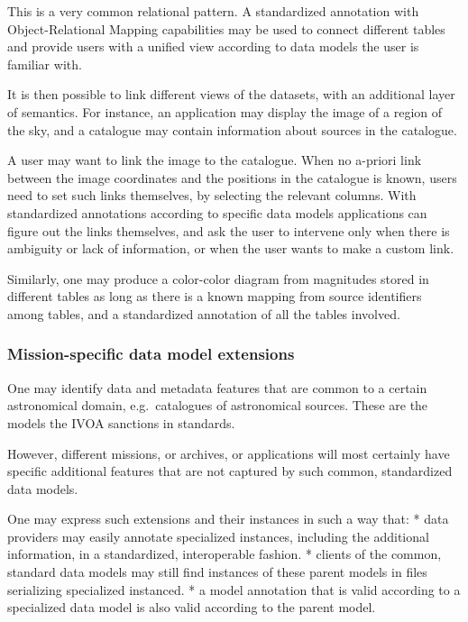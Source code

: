 \documentclass[11pt,a4paper]{ivoa}
\begin{document}
This is a very common relational pattern. A standardized annotation with
Object-Relational Mapping capabilities may be used to connect different
tables and provide users with a unified view according to data models
the user is familiar with.

It is then possible to link different views of the datasets, with an
additional layer of semantics. For instance, an application may display
the image of a region of the sky, and a catalogue may contain
information about sources in the catalogue.

A user may want to link the image to the catalogue. When no a-priori
link between the image coordinates and the positions in the catalogue is
known, users need to set such links themselves, by selecting the
relevant columns. With standardized annotations according to specific
data models applications can figure out the links themselves, and ask
the user to intervene only when there is ambiguity or lack of
information, or when the user wants to make a custom link.

Similarly, one may produce a color-color diagram from magnitudes stored
in different tables as long as there is a known mapping from source
identifiers among tables, and a standardized annotation of all the
tables involved.

\subsubsection{Mission-specific data model
extensions}\label{mission-specific-data-model-extensions}

One may identify data and metadata features that are common to a certain
astronomical domain, e.g.~catalogues of astronomical sources. These are
the models the IVOA sanctions in standards.

However, different missions, or archives, or applications will most
certainly have specific additional features that are not captured by
such common, standardized data models.

One may express such extensions and their instances in such a way that:
* data providers may easily annotate specialized instances, including
the additional information, in a standardized, interoperable fashion. *
clients of the common, standard data models may still find instances of
these parent models in files serializing specialized instanced. * a
model annotation that is valid according to a specialized data model is
also valid according to the parent model.
\end{document}
